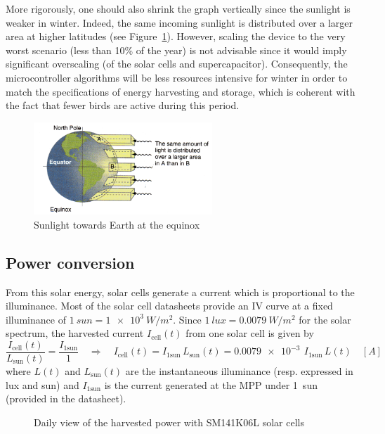 \documentclass{EPL-master-thesis-covers-EN}
\newcommand{\te}[1]{\textrm{#1}}
\begin{document}
More rigorously, one should also shrink the graph vertically since the sunlight is weaker in winter. Indeed, the same incoming sunlight is distributed over a larger area at higher latitudes (see Figure~\ref{fig:sunlight_png}). However, scaling the device to the very worst scenario (less than 10\% of the year) is not advisable since it would imply significant overscaling (of the solar cells and supercapacitor). Consequently, the microcontroller algorithms will be less resources intensive for winter in order to match the specifications of energy harvesting and storage, which is coherent with the fact that fewer birds are active during this period.

\begin{figure}[H]
    \centering
    \includegraphics[width=0.6\textwidth]{sunlight.png}
    \caption[Sunlight towards Earth at the equinox]{Sunlight towards Earth at the equinox~\cite{ackerman2007meteorology}}
    \label{fig:sunlight_png}
\end{figure}


\subsection*{Power conversion}

From this solar energy, solar cells generate a current which is proportional to the illuminance. Most of the solar cell datasheets provide an IV curve at a fixed illuminance of $\SI{1}{sun} = \SI{1e3}{W/m^2}$. Since $\SI{1}{lux} = \SI{0.0079}{W/m^2}$ for the solar spectrum, the harvested current $I_\te{cell}(t)$ from one solar cell is given by
\[
  \frac{I_\te{cell}(t)}{L_\te{sun}(t)} = \frac{I_{1\te{sun}}}{1} \quad \Rightarrow \quad I_\te{cell}(t) = I_{1\te{sun}}\,L_\te{sun}(t) = \SI{0.0079e-3}{}\,I_{1\te{sun}}\,L(t) \quad \si{[A]}
\]
where $L(t)$ and $L_{\te{sun}}(t)$ are the instantaneous illuminance (resp. expressed in lux and sun) and $I_{1\te{sun}}$ is the current generated at the MPP under \SI{1}{sun} (provided in the datasheet).

\begin{figure}[H]
    \centering
    
    \caption{Daily view of the harvested power with SM141K06L solar cells}
    \label{fig:P_cell}
\end{figure}
\end{document}

